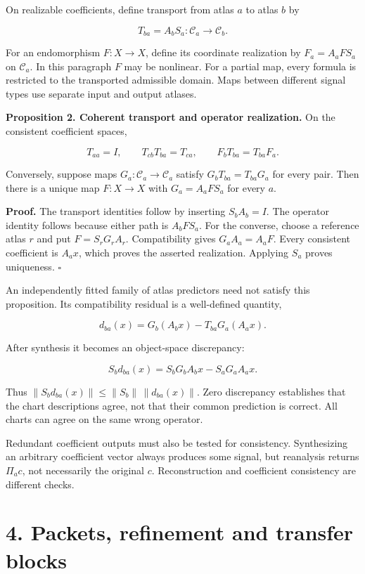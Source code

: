 \documentclass[11pt,letterpaper]{article}
\begin{document}
On realizable coefficients, define transport from atlas \(a\) to atlas
\(b\) by

\[
T_{ba}=A_bS_a:\mathcal C_a\longrightarrow\mathcal C_b.
\]

For an endomorphism \(F:X\to X\), define its coordinate realization by
\(F_a=A_aFS_a\) on \(\mathcal C_a\). In this paragraph \(F\) may be
nonlinear. For a partial map, every formula is restricted to the
transported admissible domain. Maps between different signal types use
separate input and output atlases.

\textbf{Proposition 2. Coherent transport and operator realization.} On
the consistent coefficient spaces,

\[
T_{aa}=I,\qquad T_{cb}T_{ba}=T_{ca},\qquad
F_bT_{ba}=T_{ba}F_a.
\]

Conversely, suppose maps \(G_a:\mathcal C_a\to\mathcal C_a\) satisfy
\(G_bT_{ba}=T_{ba}G_a\) for every pair. Then there is a unique map
\(F:X\to X\) with \(G_a=A_aFS_a\) for every \(a\).

\textbf{Proof.} The transport identities follow by inserting
\(S_bA_b=I\). The operator identity follows because either path is
\(A_bFS_a\). For the converse, choose a reference atlas \(r\) and put
\(F=S_rG_rA_r\). Compatibility gives \(G_aA_a=A_aF\). Every consistent
coefficient is \(A_ax\), which proves the asserted realization. Applying
\(S_a\) proves uniqueness. \(\square\)

An independently fitted family of atlas predictors need not satisfy this
proposition. Its compatibility residual is a well-defined quantity,

\[
d_{ba}(x)=G_b(A_bx)-T_{ba}G_a(A_ax).
\]

After synthesis it becomes an object-space discrepancy:

\[
S_bd_{ba}(x)=S_bG_bA_bx-S_aG_aA_ax.
\]

Thus \(\|S_bd_{ba}(x)\|\leq\|S_b\|\,\|d_{ba}(x)\|\). Zero discrepancy
establishes that the chart descriptions agree, not that their common
prediction is correct. All charts can agree on the same wrong operator.

Redundant coefficient outputs must also be tested for consistency.
Synthesizing an arbitrary coefficient vector always produces some
signal, but reanalysis returns \(\Pi_ac\), not necessarily the original
\(c\). Reconstruction and coefficient consistency are different checks.

\section{4. Packets, refinement and transfer
blocks}\label{packets-refinement-and-transfer-blocks}
\end{document}
